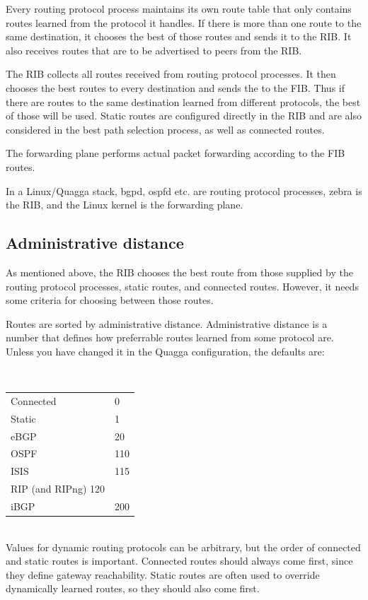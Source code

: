 Every routing protocol process maintains its own route table that only contains routes learned
from the protocol it handles. If there is more than one route to the same destination, it
chooses the best of those routes and sends it to the RIB. It also receives routes that
are to be advertised to peers from the RIB.

The RIB collects all routes received from routing protocol processes. It then chooses the best
routes to every destination and sends the to the FIB. Thus if there are routes to the same
destination learned from different protocols, the best of those will be used. Static routes
are configured directly in the RIB and are also considered in the best path selection process,
as well as connected routes.

The forwarding plane performs actual packet forwarding according to the FIB routes.

In a Linux/Quagga stack, bgpd, ospfd etc. are routing protocol processes, zebra is the RIB,
and the Linux kernel is the forwarding plane.

\subsection{Administrative distance}

As mentioned above, the RIB chooses the best route from those supplied by the routing 
protocol processes, static routes, and connected routes. However, it needs some criteria
for choosing between those routes.

Routes are sorted by administrative distance. Administrative distance is a number that
defines how preferrable routes learned from some protocol are. Unless you have changed it
in the Quagga configuration, the defaults are:

\ \\

\noindent{}\begin{tabular}{ll}
\hline
Connected & 0 \\
Static & 1 \\
eBGP & 20 \\
OSPF & 110 \\
ISIS & 115 \\
RIP (and RIPng) 120 \\
iBGP & 200 \\
\hline
\end{tabular}

\ \\

Values for dynamic routing protocols can be arbitrary, but the order of connected
and static routes is important. Connected routes should always come first, since
they define gateway reachability. Static routes are often used to override dynamically
learned routes, so they should also come first.
